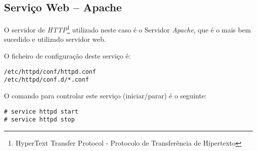 \subsection{Serviço Web -- Apache}

O servidor de \emph{HTTP}\footnote{HyperText Transfer Protocol - Protocolo de Transferência de Hipertexto} utilizado neste caso é o Servidor \emph{Apache}, que é o mais bem sucedido e utilizado servidor web.

O ficheiro de configuração deste serviço é:

\begin{Verbatim}[commandchars=\\\{\}]
/etc/httpd/conf/httpd.conf
/etc/httpd/conf.d/*.conf
\end{Verbatim}

O comando para controlar este serviço (iniciar/parar) é o seguinte:

\begin{Verbatim}[commandchars=\\\{\}]
# service httpd start
# service httpd stop
\end{Verbatim}


